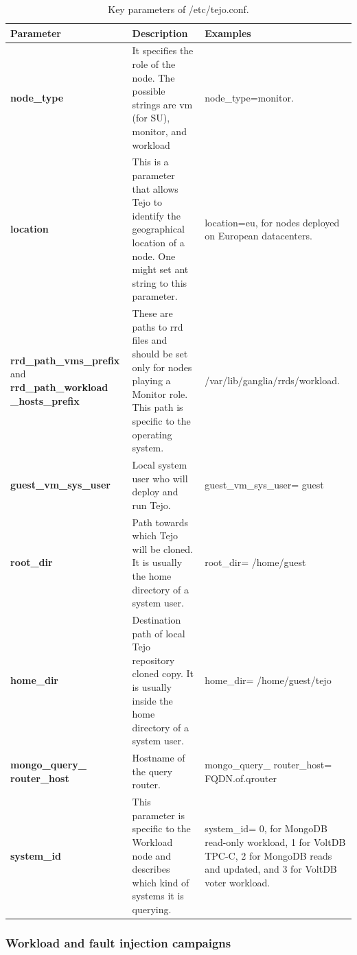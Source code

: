 			\begin{table}[htdp]
				\begin{center}
\caption{Key parameters of /etc/tejo.conf.}
  \label{tab:common_install_conf}
					\begin{tabular}{R{4cm} || L{6cm} L{3cm} }
						{\bf Parameter}&{\bf Description}&{\bf Examples} \\  
						\hline
						\hline
						{\bf node\_type}&It specifies the role of the node. The possible strings are vm (for SU), monitor, and workload & node\_type=monitor. \\
						\hline
						{\bf location}&This is a parameter that allows Tejo to identify the geographical location of a node. One might set ant string to this parameter. & location=eu, for nodes deployed on European datacenters. \\
						\hline
						{\bf rrd\_path\_vms\_prefix} and {\bf rrd\_path\_workload \_hosts\_prefix}&These are paths to rrd files and should be set only for nodes playing a Monitor role. This path is specific to the operating system. & /var/lib/ganglia/rrds/workload. \\
						\hline
						{\bf guest\_vm\_sys\_user} &Local system user who will deploy and run Tejo.&guest\_vm\_sys\_user= guest\\
						\hline
						{\bf root\_dir} &Path towards which Tejo will be cloned. It is usually the home directory of a system user.&root\_dir= /home/guest\\
						\hline
						{\bf home\_dir} &Destination path of local Tejo repository cloned copy. It is usually inside the home directory of a system user.&home\_dir= /home/guest/tejo\\
						\hline
						{\bf mongo\_query\_ router\_host} &Hostname of the query router.&mongo\_query\_ router\_host= FQDN.of.qrouter\\
						\hline
						{\bf system\_id} &This parameter is specific to the Workload node and describes which kind of systems it is querying.&system\_id= 0, for MongoDB read-only workload, 1 for VoltDB TPC-C, 2 for MongoDB reads and updated, and 3 for VoltDB voter workload.\\
					\end{tabular}
				\end{center}
			\end{table}

\subsubsection{Workload and fault injection campaigns}

